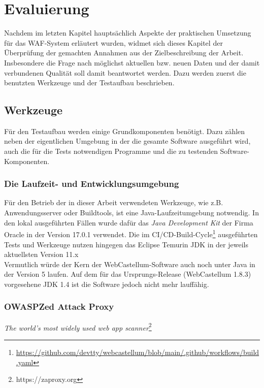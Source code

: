 \chapter{Evaluierung}


Nachdem im letzten Kapitel hauptsächlich Aspekte der praktischen Umsetzung für das WAF-System erläutert wurden, widmet sich dieses Kapitel der Überprüfung der gemachten Annahmen aus der Zielbeschreibung der Arbeit. Insbesondere die Frage nach möglichst aktuellen bzw. neuen Daten und der damit verbundenen Qualität soll damit beantwortet werden. Dazu werden zuerst die benutzten Werkzeuge und der Testaufbau beschrieben. 

\section{Werkzeuge}
Für den Testaufbau werden einige Grundkomponenten benötigt. Dazu zählen neben der eigentlichen Umgebung in der die gesamte Software ausgeführt wird, auch die für die Tests notwendigen Programme und die zu testenden Software-Komponenten.

\subsection{Die Laufzeit- und Entwicklungsumgebung}
Für den Betrieb der in dieser Arbeit verwendeten Werkzeuge, wie z.B. Anwendungsserver oder Buildtools, ist eine Java-Laufzeitumgebung notwendig. In den lokal ausgeführten Fällen wurde dafür das \emph{Java Development Kit} der Firma Oracle in der Version 17.0.1 verwendet. Die im CI/CD-Build-Cycle\footnote{\url{https://github.com/devtty/webcastellum/blob/main/.github/workflows/build.yaml}} ausgeführten Tests und Werkzeuge nutzen hingegen das Eclipse Temurin JDK in der jeweils aktuellsten Version 11.x\\ Vermutlich würde der Kern der WebCastellum-Software auch noch unter Java in der Version 5 laufen. Auf dem für das Ursprungs-Release (WebCastellum 1.8.3) vorgesehene JDK 1.4 ist die Software jedoch nicht mehr lauffähig.


\subsection{OWASP\textregistered  Zed Attack Proxy}
\label{ref:zap}

\emph{The world's most widely used web app scanner}\footnote{https://zaproxy.org}\\

